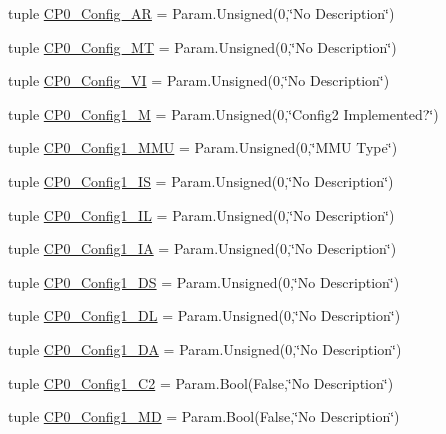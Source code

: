 \begin{DoxyCompactItemize}
tuple \hyperlink{classMipsCPU_1_1BaseMipsCPU_a190c17f9827e26188ded0ee904871e8e}{CP0\_\-Config\_\-AR} = Param.Unsigned(0,\char`\"{}No Description\char`\"{})
\item 
tuple \hyperlink{classMipsCPU_1_1BaseMipsCPU_ae4391661b7a034779ebd497450a311f3}{CP0\_\-Config\_\-MT} = Param.Unsigned(0,\char`\"{}No Description\char`\"{})
\item 
tuple \hyperlink{classMipsCPU_1_1BaseMipsCPU_aa8b9aabfdafafc150995737ab0f9ed58}{CP0\_\-Config\_\-VI} = Param.Unsigned(0,\char`\"{}No Description\char`\"{})
\item 
tuple \hyperlink{classMipsCPU_1_1BaseMipsCPU_a219543c61e746510759955cbb4a5bb1e}{CP0\_\-Config1\_\-M} = Param.Unsigned(0,\char`\"{}Config2 Implemented?\char`\"{})
\item 
tuple \hyperlink{classMipsCPU_1_1BaseMipsCPU_a251ce2a8fdbc8fff949c31dc01845650}{CP0\_\-Config1\_\-MMU} = Param.Unsigned(0,\char`\"{}MMU Type\char`\"{})
\item 
tuple \hyperlink{classMipsCPU_1_1BaseMipsCPU_a471ff632ecf23727fcf1796c33a1a1dd}{CP0\_\-Config1\_\-IS} = Param.Unsigned(0,\char`\"{}No Description\char`\"{})
\item 
tuple \hyperlink{classMipsCPU_1_1BaseMipsCPU_aaa196dbd7bde04f957ba2416824150ae}{CP0\_\-Config1\_\-IL} = Param.Unsigned(0,\char`\"{}No Description\char`\"{})
\item 
tuple \hyperlink{classMipsCPU_1_1BaseMipsCPU_a8c1b4b0921d2ab939cb0bc96a08d65a7}{CP0\_\-Config1\_\-IA} = Param.Unsigned(0,\char`\"{}No Description\char`\"{})
\item 
tuple \hyperlink{classMipsCPU_1_1BaseMipsCPU_a76701d66f2d3b3e5a52d648144ea3d9f}{CP0\_\-Config1\_\-DS} = Param.Unsigned(0,\char`\"{}No Description\char`\"{})
\item 
tuple \hyperlink{classMipsCPU_1_1BaseMipsCPU_a43915e4c7bc247574811b326c7ae40ad}{CP0\_\-Config1\_\-DL} = Param.Unsigned(0,\char`\"{}No Description\char`\"{})
\item 
tuple \hyperlink{classMipsCPU_1_1BaseMipsCPU_aed9348fd6efd10866faccf3bd9af0970}{CP0\_\-Config1\_\-DA} = Param.Unsigned(0,\char`\"{}No Description\char`\"{})
\item 
tuple \hyperlink{classMipsCPU_1_1BaseMipsCPU_aa7b1faef28dbac130f3776cec7a9bb11}{CP0\_\-Config1\_\-C2} = Param.Bool(False,\char`\"{}No Description\char`\"{})
\item 
tuple \hyperlink{classMipsCPU_1_1BaseMipsCPU_a5d8a60ca1a38c0a962f5bd1e19195ecc}{CP0\_\-Config1\_\-MD} = Param.Bool(False,\char`\"{}No Description\char`\"{})

\end{DoxyCompactItemize}
